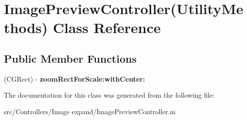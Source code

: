 \hypertarget{interface_image_preview_controller_07_utility_methods_08}{
\section{\-Image\-Preview\-Controller(\-Utility\-Methods) \-Class \-Reference}
\label{interface_image_preview_controller_07_utility_methods_08}
}
\subsection*{\-Public \-Member \-Functions}
\begin{DoxyCompactItemize}
\item 
\hypertarget{interface_image_preview_controller_07_utility_methods_08_ad2efd9f1d4b4b7f1b8bcbd172f0b7cd3}{
(\-C\-G\-Rect) -\/ {\bfseries zoom\-Rect\-For\-Scale\-:with\-Center\-:}}
\label{interface_image_preview_controller_07_utility_methods_08_ad2efd9f1d4b4b7f1b8bcbd172f0b7cd3}

\end{DoxyCompactItemize}


\-The documentation for this class was generated from the following file\-:\begin{DoxyCompactItemize}
\item 
src/\-Controllers/\-Image expand/\-Image\-Preview\-Controller.\-m\end{DoxyCompactItemize}
